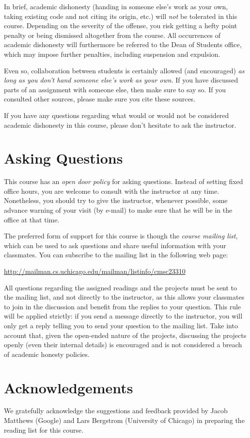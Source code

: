 \documentclass[11pt]{article}
\begin{document}
In brief, academic dishonesty (handing in someone else's work as your own, taking existing code and not citing its origin, etc.) will \emph{not} be tolerated in this course. Depending on the severity of the offense, you risk getting a hefty point penalty or being dismissed altogether from the course. All occurrences of academic dishonesty will furthermore be referred to the Dean of Students office, which may impose further penalties, including suspension and expulsion.

Even so, collaboration between students is certainly allowed (and encouraged) \emph{as long as you don't hand someone else's work as your own}. If you have discussed parts of an assignment with someone else, then make sure to say so. If you consulted other sources, please make sure you cite these sources.

If you have any questions regarding what would or would not be considered academic dishonesty in this course, please don't hesitate to ask the instructor.


\section{Asking Questions}
\label{asking}

This course has an \emph{open door policy} for asking questions. Instead of setting fixed office hours, you are welcome to consult with the instructor at any time. Nonetheless, you should try to give the instructor, whenever possible, some advance warning of your visit (by e-mail) to make sure that he will be in the office at that time.

The preferred form of support for this course is though the \emph{course mailing list}, which can be used to ask questions and share useful information with your classmates. You can subscribe to the mailing list in the following web page:

\begin{center}
\url{http://mailman.cs.uchicago.edu/mailman/listinfo/cmsc23310}
\end{center}

All questions regarding the assigned readings and the projects must be sent to the mailing list, and not directly to the instructor, as this allows your classmates to join in the discussion and benefit from the replies to your question. This rule will be applied strictly: if you send a message directly to the instructor, you will only get a reply telling you to send your question to the mailing list. Take into account that, given the open-ended nature of the projects, discussing the projects openly (even their internal details) is encouraged and is not considered a breach of academic honesty policies.

\section{Acknowledgements}

We gratefully acknowledge the suggestions and feedback provided by Jacob Matthews (Google) and Lars Bergstrom (University of Chicago) in preparing the reading list for this course.
\end{document}
